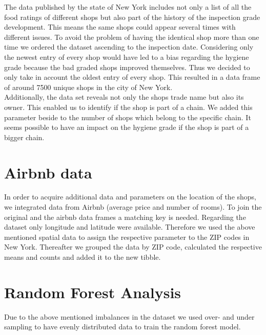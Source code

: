 \documentclass{article}
\begin{document}
The data published by the state of New York includes not only a list of all the food ratings of different shops but also part of the history of the inspection grade development. This means the same shops could appear several times with different issues. To avoid the problem of having the identical shop more than one time we ordered the dataset ascending to the inspection date. Considering only the newest entry of every shop would have led to a bias regarding the hygiene grade because the bad graded shops improved themselves. Thus we decided to only take in account the oldest entry of every shop. This resulted in a data frame of around 7500 unique shops in the city of New York.
\\
Additionally, the data set reveals not only the shops trade name but also its owner. This enabled us to identify if the shop is part of a chain. We added this parameter beside to the number of shops which belong to the specific chain. It seems possible to have an impact on the hygiene grade if the shop is part of a bigger chain. 

\section{Airbnb data}

In order to acquire additional data and parameters on the location of the shops, we integrated data from Airbnb (average price and number of rooms). To join the original and the airbnb data frames a matching key is needed. Regarding the dataset only longitude and latitude were available. Therefore we used the above mentioned spatial data to assign the respective parameter to the ZIP codes in New York. Thereafter we grouped the data by ZIP code, calculated the respective means and counts and added it to the new tibble.

\section{Random Forest Analysis}

Due to the above mentioned imbalances in the dataset we used over- and under sampling to have evenly distributed data to train the random forest model. 
\end{document}

